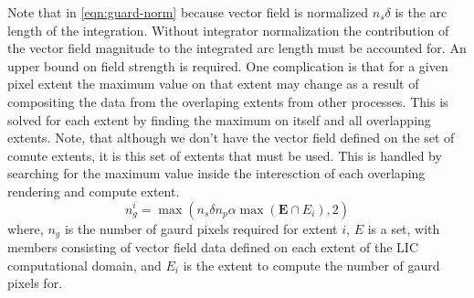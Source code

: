 \documentclass[a4paper,10pt]{article}
\begin{document}
Note that in \ref{eqn:guard-norm} because vector field is normalized $n_s \delta$ is the arc length of the integration. Without integrator normalization the contribution of the vector field magnitude to the integrated arc length must be accounted for. An upper bound on field strength is required. One complication is that for a given pixel extent the maximum value on that extent may change as a result of compositing the data from the overlaping extents from other processes. This is solved for each extent by finding the maximum on itself and all overlapping extents. Note, that although we don't have the vector field defined on the set of comute extents, it is this set of extents that must be used. This is handled by searching for the maximum value inside the interesction of each overlaping rendering and compute extent.
\begin{equation}
n_g^i = \max(n_s \delta n_p \alpha \max(\mathbf{E} \cap E_i), 2)
\label{eqn:gaurd}
\end{equation}
where, $n_g$ is the number of gaurd pixels required for extent $i$, $E$ is a set, with members consisting of vector field data defined on each extent of the LIC computational domain, and $E_i$ is the extent to compute the number of gaurd pixels for.
\FloatBarrier
\end{document}
